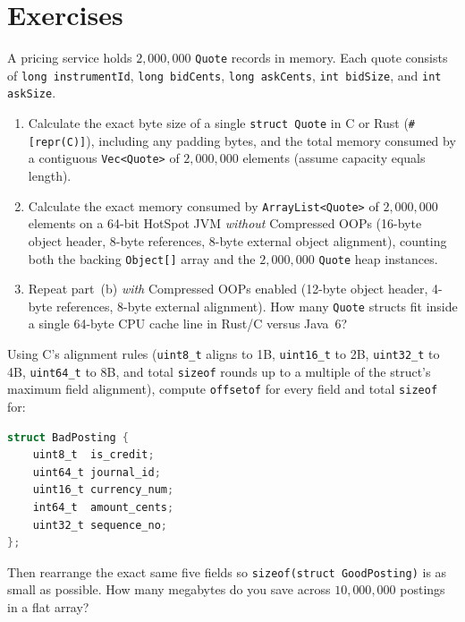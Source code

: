\section{Exercises}
\label{ch01:exercises}

\begin{exercise}
A pricing service holds $2{,}000{,}000$ \texttt{Quote} records in memory. Each quote consists of \texttt{long instrumentId}, \texttt{long bidCents}, \texttt{long askCents}, \texttt{int bidSize}, and \texttt{int askSize}.
\begin{enumerate}[label=(\alph*)]
  \item Calculate the exact byte size of a single \texttt{struct Quote} in C or Rust (\texttt{\#[repr(C)]}), including any padding bytes, and the total memory consumed by a contiguous \texttt{Vec<Quote>} of $2{,}000{,}000$ elements (assume capacity equals length).
  \item Calculate the exact memory consumed by \texttt{ArrayList<Quote>} of $2{,}000{,}000$ elements on a 64-bit HotSpot JVM \emph{without} Compressed OOPs (16-byte object header, 8-byte references, 8-byte external object alignment), counting both the backing \texttt{Object[]} array and the $2{,}000{,}000$ \texttt{Quote} heap instances.
  \item Repeat part~(b) \emph{with} Compressed OOPs enabled (12-byte object header, 4-byte references, 8-byte external alignment). How many \texttt{Quote} structs fit inside a single 64-byte CPU cache line in Rust/C versus Java~6?
\end{enumerate}
\end{exercise}

\begin{exercise}
Using C's alignment rules (\texttt{uint8\_t} aligns to 1B, \texttt{uint16\_t} to 2B, \texttt{uint32\_t} to 4B, \texttt{uint64\_t} to 8B, and total \texttt{sizeof} rounds up to a multiple of the struct's maximum field alignment), compute \texttt{offsetof} for every field and total \texttt{sizeof} for:
\begin{lstlisting}[language=C]
struct BadPosting {
    uint8_t  is_credit;
    uint64_t journal_id;
    uint16_t currency_num;
    int64_t  amount_cents;
    uint32_t sequence_no;
};
\end{lstlisting}
Then rearrange the exact same five fields so \texttt{sizeof(struct GoodPosting)} is as small as possible. How many megabytes do you save across $10{,}000{,}000$ postings in a flat array?
\end{exercise}

